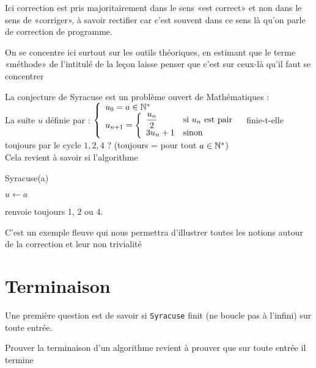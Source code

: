 

\begin{com}
	Ici correction est pris majoritairement dans le sens «est correct» et non dans le sens de «corriger», à savoir rectifier car c'est souvent dans ce sens là qu'on parle de correction de programme.
\end{com}

\begin{com}
	On se concentre ici surtout sur les outils théoriques, en estimant que le terme «méthode» de l'intitulé de la leçon laisse penser que c'est sur ceux-là qu'il faut se concentrer
\end{com}

La conjecture de Syracuse est un problème ouvert de Mathématiques : \\
La suite $u$ définie par : $\left\{ \begin{array}{l}
	u_0 = a \in \mathbb{N}^*\\
	u_{n+1} = \left\{\begin{array}{ll}
		\dfrac{u_n}{2} & \text{si } u_n \text{ est pair}\\
		3u_n+1 & \text{sinon}
	\end{array}\right.
\end{array}\right.$ finie-t-elle toujours par le cycle $1,2,4$ ? (toujours = pour tout $a\in \mathbb{N}^*$)\\

Cela revient à savoir si l'algorithme \\
\begin{algorithm}[H]
	\caption{Syracuse(a)}
	$u \gets a$\\
\end{algorithm}
renvoie toujours 1, 2 ou 4.

\begin{com}
	C'est un exemple fleuve qui nous permettra d'illustrer toutes les notions autour de la correction et leur non trivialité
\end{com}
\section{Terminaison}
Une première question est de savoir si \texttt{Syracuse} finit (ne boucle pas à l'infini) sur toute entrée.

\begin{definition}
	Prouver la terminaison d'un algorithme revient à prouver que sur toute entrée il termine
\end{definition}

